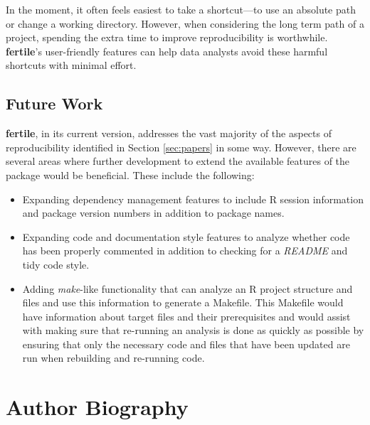 \documentclass[APA,LATO1COL]{WileyNJD-v2}\usepackage[]{graphicx}\usepackage[]{color}
\newcommand{\R}{\textsf{R}\xspace}
\newcommand{\cmd}[1]{\textit{#1}}
\newcommand{\pkg}[1]{\textbf{#1}}
\begin{document}
In the moment, it often feels easiest to take a shortcut---to use an absolute path or change a working directory. However, when considering the long term path of a project, spending the extra time to improve reproducibility is worthwhile. \pkg{fertile}'s user-friendly features can help data analysts avoid these harmful shortcuts with minimal effort.

\subsection{Future Work}\label{sec:future}

\pkg{fertile}, in its current version, addresses the vast majority of the aspects of reproducibility identified in Section \ref{sec:papers} in some way. However, there are several areas where further development to extend the available features of the package would be beneficial. These include the following:

\begin{itemize} [noitemsep]
  \item Expanding dependency management features to include \R session information and package version numbers in addition to package names.
  \item Expanding code and documentation style features to analyze whether code has been properly commented in addition to checking for a \cmd{README} and tidy code style.
  \item Adding \cmd{make}-like functionality that can analyze an \R project structure and files and use this information to generate a Makefile. This Makefile would have information about target files and their prerequisites and would assist with making sure that re-running an analysis is done as quickly as possible by ensuring that only the necessary code and files that have been updated are run when rebuilding and re-running code.
\end{itemize}




\nocite{*}%
%

\section*{Author Biography}
\end{document}
